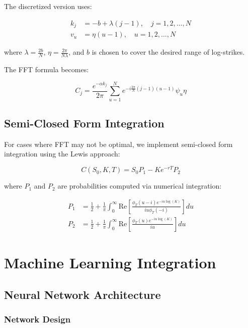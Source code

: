 \documentclass[12pt,a4paper]{article}
\begin{document}
The discretized version uses:

\begin{align}
k_j &= -b + \lambda(j-1), \quad j = 1, 2, \ldots, N \\
v_u &= \eta(u-1), \quad u = 1, 2, \ldots, N
\end{align}

where $\lambda = \frac{2b}{N}$, $\eta = \frac{2\pi}{N\lambda}$, and $b$ is chosen to cover the desired range of log-strikes.

The FFT formula becomes:

\begin{equation}
C_j = \frac{e^{-\alpha k_j}}{2\pi} \sum_{u=1}^{N} e^{-i\frac{2\pi}{N}(j-1)(u-1)} \psi_u \eta
\end{equation}

\subsection{Semi-Closed Form Integration}

For cases where FFT may not be optimal, we implement semi-closed form integration using the Lewis \citep{lewis2000simple} approach:

\begin{equation}
C(S_0, K, T) = S_0 P_1 - Ke^{-rT} P_2
\end{equation}

where $P_1$ and $P_2$ are probabilities computed via numerical integration:

\begin{align}
P_1 &= \frac{1}{2} + \frac{1}{\pi} \int_0^{\infty} \text{Re}\left[\frac{\phi_T(u-i)e^{-iu\log(K)}}{iu\phi_T(-i)}\right] du \\
P_2 &= \frac{1}{2} + \frac{1}{\pi} \int_0^{\infty} \text{Re}\left[\frac{\phi_T(u)e^{-iu\log(K)}}{iu}\right] du
\end{align}

\section{Machine Learning Integration}

\subsection{Neural Network Architecture}

\subsubsection{Network Design}
\end{document}
